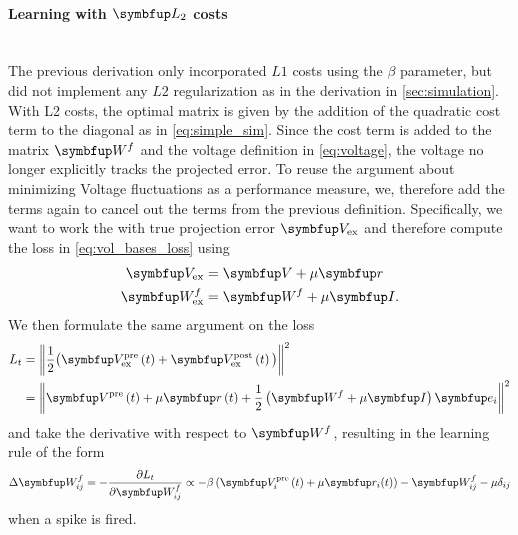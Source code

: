 \paragraph{Learning with $\bmu{L_2}$ costs}\mbox{}\\
The previous derivation only incorporated $L1$ costs using the $\beta$ parameter, but did not implement any $L2$ regularization as in the derivation in \cref{sec:simulation}. With L2 costs, the optimal matrix is given by the addition of the quadratic cost term to the diagonal as in \cref{eq:simple_sim}. Since the cost term is added to the matrix $\bmu{W}^f$ and the voltage definition in \cref{eq:voltage}, the voltage no longer explicitly tracks the projected error. To reuse the argument about minimizing Voltage fluctuations as a performance measure, we, therefore add the terms again to cancel out the terms from the previous definition. Specifically, we want to work the with true projection error $\bmu{V}_{\text{ex}}$ and therefore compute the loss in \cref{eq:vol_bases_loss} using
\begin{equation}\label{eq:Wf_learning_rule_improved}
\begin{aligned}
	\bmu{V}_{\text{ex}} &= \bmu{V} + \mu\bmu{r}\\
	\bmu{W}^f_{\text{ex}} & = \bmu{W}^f + \mu\bmu{I}.
\end{aligned}
\end{equation}
We then formulate the same argument on the loss
\begin{equation}\label{eq:vol_bases_loss}
\begin{aligned}
L_t & =\left\|\frac{1}{2}\big(\bmu{V}^{\text {pre}}_{\text{ex}}\left(t\right)+\bmu{V}^{\text {post}}_\text{ex}\left(t\right)\big)\right\|^2 \\
& =\left\|\bmu{V}^{\text {pre}}\left(t\right)+ \mu\bmu{r}\left(t\right) + \frac{1}{2}\left(\bmu{W}^f + \mu \bmu{I}\right)\bmu{e}_{i}\right\|^2
\end{aligned}
\end{equation}
and take the derivative with respect to $\bmu{W}^f$, resulting in the learning rule of the form
\begin{equation}
\Delta \bmu{W}^f_{ij} =-\frac{\partial L_t}{\partial \bmu{W}^f_{ij}} \propto - \beta\left( \bmu{V}_i^{\text {pre}}\left(t\right) + \mu \bmu{r}_i(t)\right) -\bmu{W}^f_{ij} -\mu\delta_{ij}
\end{equation}
when a spike is fired.

